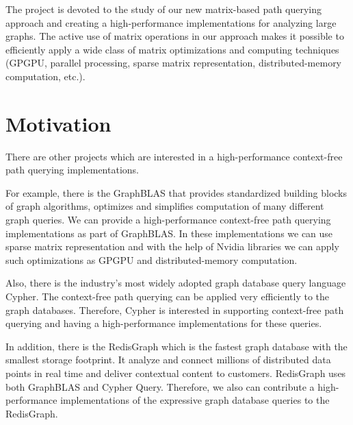 \documentclass[12pt]{article}  %
\theoremstyle{remark}
\begin{document}
The project is devoted to the study of our new matrix-based path querying approach and creating a high-performance implementations for analyzing large graphs. The active use of matrix operations in our approach makes it possible to efficiently apply a wide class of matrix optimizations and computing techniques (GPGPU, parallel processing, sparse matrix representation, distributed-memory computation, etc.).

\section{Motivation}
There are other projects which are interested in a high-performance context-free path querying implementations.

For example, there is the GraphBLAS that provides standardized building blocks of graph algorithms, optimizes and simplifies computation of many different graph queries. We can provide a high-performance context-free path querying implementations as part of GraphBLAS. In these implementations we can use sparse matrix representation and with the help of Nvidia libraries we can apply such optimizations as GPGPU and distributed-memory computation.

Also, there is the industry’s most widely adopted graph database query language Cypher. The context-free path querying can be applied very efficiently to the graph databases. Therefore, Cypher is interested in supporting context-free path querying and having a high-performance implementations for these queries.

In addition, there is the RedisGraph which is the fastest graph database with the smallest storage footprint. It analyze and connect millions of distributed data points in real time and deliver contextual content to customers. RedisGraph uses both GraphBLAS and Cypher Query. Therefore, we also can contribute a high-performance implementations of the expressive graph database queries to the RedisGraph. 


\end{document}
